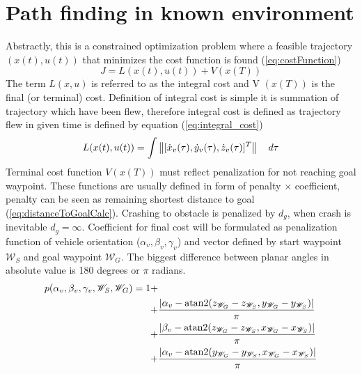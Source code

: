 \section{Path finding in known environment}\label{ch:pathfindingInKnownEnviroment}
\noindent Abstractly, this is a constrained optimization problem where a feasible
trajectory $(x(t),u(t))$ that minimizes the cost function is found (\ref{eq:costFunction})
\begin{equation}\label{eq:costFunction}
    J =  L(x(t),u(t)) + V(x(T))
\end{equation}
The term $L(x,u)$ is referred to as the integral cost and V $(x(T))$ is the final (or terminal) cost. Definition of integral cost is simple it is summation of trajectory which have been flew, therefore integral cost is defined as trajectory flew in given time is defined by equation (\ref{eq:integral_cost})
\begin{equation}\label{eq:integral_cost}
    L(x(t),u(t)) = \int \left\lVert[\dot{x}_v(\tau),\dot{y}_v(\tau),\dot{z}_v(\tau)]^T\right\rVert\quad d\tau
\end{equation}
Terminal cost function $V(x(T))$ must reflect penalization for not reaching goal waypoint. These functions are usually defined in form of penalty $\times$ coefficient, penalty can be seen as remaining shortest distance to goal (\ref{eq:distanceToGoalCalc}). Crashing to obstacle is penalized by $d_g$, when crash is inevitable $d_g=\infty$. Coefficient for final cost will be formulated as penalization function of vehicle orientation ($\alpha_v,\beta_v,\gamma_v$) and vector defined by start waypoint $\mathscr{W}_S$ and goal waypoint $\mathscr{W}_G$. The biggest difference between planar angles in absolute value is 180 degrees or $\pi$ radians. 
\begin{equation}\label{eq:penalizationCoeficient}
    \begin{aligned}
    p(\alpha_v,\beta_v,\gamma_v,\mathscr{W}_S,\mathscr{W}_G)= 1 +&\\
    +&\frac{\left|{\alpha_v -   \textnormal{atan2}(z_{\mathscr{W}_G}-z_{\mathscr{W}_S},y_{\mathscr{W}_G}-y_{\mathscr{W}_S})}\right|}{\pi}\\
    +&\frac{\left|{\beta_v -   \textnormal{atan2}(z_{\mathscr{W}_G}-z_{\mathscr{W}_S},x_{\mathscr{W}_G}-x_{\mathscr{W}_S})}\right|}{\pi}\\
    +&\frac{\left|{\alpha_v -   \textnormal{atan2}(y_{\mathscr{W}_G}-y_{\mathscr{W}_S},x_{\mathscr{W}_G}-x_{\mathscr{W}_S})}\right|}{\pi}\\
    \end{aligned}
\end{equation}
